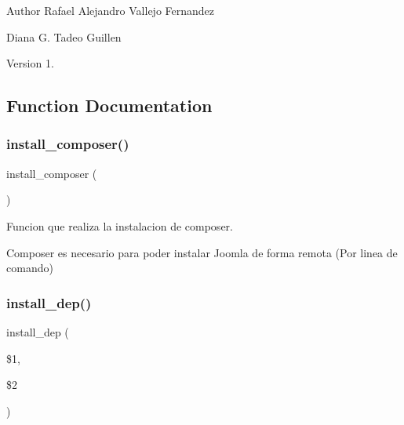 \begin{DoxyAuthor}{Author}
Rafael Alejandro Vallejo Fernandez 

Diana G. Tadeo Guillen 
\end{DoxyAuthor}
\begin{DoxyVersion}{Version}
1. 
\end{DoxyVersion}


\subsection{Function Documentation}
\mbox{\label{Joomla__Instalador__General_8sh_a9cbb91389a71b89c6cab0848d688e423}} 
\subsubsection{\texorpdfstring{install\+\_\+composer()}{install\_composer()}}
{\footnotesize\ttfamily install\+\_\+composer (\begin{DoxyParamCaption}{ }\end{DoxyParamCaption})}



Funcion que realiza la instalacion de composer. 

Composer es necesario para poder instalar Joomla de forma remota (Por linea de comando) \mbox{\label{Joomla__Instalador__General_8sh_a7aff02becf631a8cd3f06f1fc2688670}} 
\subsubsection{\texorpdfstring{install\+\_\+dep()}{install\_dep()}}
{\footnotesize\ttfamily install\+\_\+dep (\begin{DoxyParamCaption}\item[{}]{\$1,  }\item[{}]{\$2 }\end{DoxyParamCaption})}



